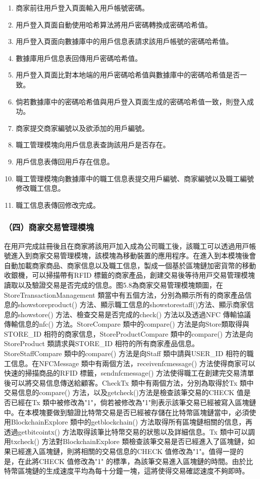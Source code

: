 	\begin{enumerate}
	\item 商家前往用戶登入頁面輸入用戶帳號密碼。
	\item 用戶登入頁面自動使用哈希算法將用戶密碼轉換成密碼哈希值。
	\item 用戶登入頁面向數據庫中的用戶信息表請求該用戶帳號的密碼哈希值。
	\item 數據庫用戶信息表回傳用戶密碼哈希值。
	\item 用戶登入頁面比對本地端的用戶密碼哈希值與數據庫中的密碼哈希值是否一致。
	\item 倘若數據庫中的密碼哈希值與用戶登入頁面生成的密碼哈希值一致，則登入成功。
	\item 商家提交商家編號以及欲添加的用戶編號。
	\item 職工管理模塊向用戶信息表查詢該用戶是否存在。
	\item 用戶信息表傳回用戶存在信息。
	\item 職工管理模塊向數據庫中的職工信息表提交用戶編號、商家編號以及職工編號修改職工信息。
	\item 職工信息表傳回修改完成。
	\end{enumerate}

\subsubsection{（四）商家交易管理模塊}
在⽤⼾完成註冊後且在商家將該⽤⼾加⼊成為公司職⼯後，該職⼯可以透過⽤⼾帳號進⼊到商家交易管理模塊，該模塊為移動裝置的應⽤程序。在進⼊到本模塊後會⾃動加載商家商品、商家信息以及職⼯信息，製成⼀個基於區塊鏈加密貨幣的移動收銀機，可以掃描帶有RFID 標籤的商家產品，創建交易後等待⽤⼾交易管理模塊讀取以及驗證交易是否完成的信息。图5.8為商家交易管理模塊類圖，在StoreTransactionManagement 類當中有五個⽅法，分別為顯⽰所有的商家產品信息的showstoreproduct() ⽅法、顯⽰職⼯信息的showstorestaff()⽅法、顯⽰商家信息的showstore() ⽅法、檢查交易是否完成的check() ⽅法以及透過NFC 傳輸協議傳輸信息的nfc() ⽅法。StoreCompare 類中的compare() ⽅法是向Store類取得與STORE\_ID 相符的商家信息，StoreProductCompare 類中的compare() ⽅法是向StoreProduct 類請求與STORE\_ID 相符的所有商家產品信息。StoreStaffCompare 類中的compare() ⽅法是向Staff 類中請與USER\_ID 相符的職⼯信息。在NFCMessage 類中有兩個⽅法，receivenfcmessage() ⽅法使得商家可以快速的掃描商品的RFID 標籤，sendnfcmessage() ⽅法使得職⼯在創建完交易清單後可以將交易信息傳送給顧客。CheckTx 類中有兩個⽅法，分別為取得於Tx 類中交易信息的compare() ⽅法，以及getcheck()⽅法是檢查該筆交易的CHECK 值是否已經在Tx 類中被修改為"1"，倘若被修改為"1"則表示該筆交易已經被寫⼊區塊鏈中。在本模塊要做到驗證⽐特幣交易是否已經被存儲在⽐特幣區塊鏈當中，必須使⽤BlockchainExplore 類中的getblockchain() ⽅法取得所有區塊鏈相關的信息，再透過getbitcointx() ⽅法取得該筆⽐特幣交易的狀態以及詳細信息。Tx 類中可以調⽤txcheck() ⽅法對BlockchainExplore 類檢查該筆交易是否已經進⼊了區塊鏈，如果已經進⼊區塊鏈，則將相關的交易信息的CHECK 值修改為"1"。值得⼀提的是，在此將CHECK 值修改為"1" 的標準，為該筆交易進⼊區塊鏈的時間。由於⽐特幣區塊鏈的⽣成速度平均為每⼗分鐘⼀塊，這將使得交易確認速度不夠即時。


